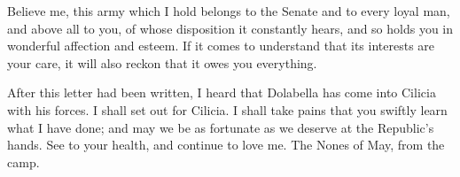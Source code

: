  Believe me, this army which I hold belongs to the Senate and to every loyal man, and above all to you, of whose disposition it constantly hears, and so holds you in wonderful affection and esteem. If it comes to understand that its interests are your care, it will also reckon that it owes you everything.

 After this letter had been written, I heard that Dolabella has come into Cilicia with his forces. I shall set out for Cilicia. I shall take pains that you swiftly learn what I have done; and may we be as fortunate as we deserve at the Republic's hands. See to your health, and continue to love me. The Nones of May, from the camp.
